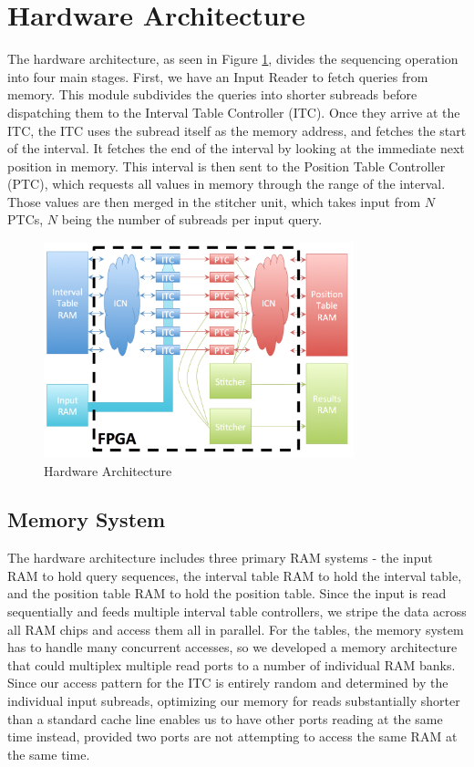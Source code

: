 \documentclass[11pt]{article}
\begin{document}
\section{Hardware Architecture}

The hardware architecture, as seen in Figure \ref{arch}, divides the sequencing operation into four main stages.  First, we have an Input Reader to fetch queries from memory.  This module subdivides the queries into shorter subreads before dispatching them to the Interval Table Controller (ITC).  Once they arrive at the ITC, the ITC uses the subread itself as the memory address, and fetches the start of the interval.  It fetches the end of the interval by looking at the immediate next position in memory.  This interval is then sent to the Position Table Controller (PTC), which requests all values in memory through the range of the interval.  Those values are then merged in the stitcher unit, which takes input from $N$ PTCs, $N$ being the number of subreads per input query.
\begin{figure}[ht!]
\centering
\includegraphics[width=90mm]{architecture.png}
\caption{Hardware Architecture}
\label{arch}
\end{figure}


\subsection{Memory System}
The hardware architecture includes three primary RAM systems - the input RAM to hold query sequences, the interval table RAM to hold the interval table, and the position table RAM to hold the position table.  Since the input is read sequentially and feeds multiple interval table controllers, we  stripe the data across all RAM chips and access them all in parallel.  For the tables, the memory system has to handle many concurrent accesses, so we developed a memory architecture that could multiplex multiple read ports to a number of individual RAM banks.  Since our access pattern for the ITC is entirely random and determined by the individual input subreads, optimizing our memory for reads substantially shorter than a standard cache line enables us to have other ports reading at the same time instead, provided two ports are not attempting to access the same RAM at the same time.
\end{document}

